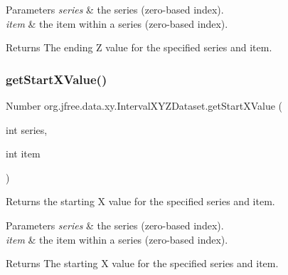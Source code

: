 \begin{DoxyParams}{Parameters}
{\em series} & the series (zero-\/based index). \\
\hline
{\em item} & the item within a series (zero-\/based index).\\
\hline
\end{DoxyParams}
\begin{DoxyReturn}{Returns}
The ending Z value for the specified series and item. 
\end{DoxyReturn}
\mbox{\label{interfaceorg_1_1jfree_1_1data_1_1xy_1_1_interval_x_y_z_dataset_aa5815ef78ab95b0d134c0b7a063bf955}} 
\subsubsection{\texorpdfstring{get\+Start\+X\+Value()}{getStartXValue()}}
{\footnotesize\ttfamily Number org.\+jfree.\+data.\+xy.\+Interval\+X\+Y\+Z\+Dataset.\+get\+Start\+X\+Value (\begin{DoxyParamCaption}\item[{int}]{series,  }\item[{int}]{item }\end{DoxyParamCaption})}

Returns the starting X value for the specified series and item.


\begin{DoxyParams}{Parameters}
{\em series} & the series (zero-\/based index). \\
\hline
{\em item} & the item within a series (zero-\/based index).\\
\hline
\end{DoxyParams}
\begin{DoxyReturn}{Returns}
The starting X value for the specified series and item. 
\end{DoxyReturn}
\mbox{\label{interfaceorg_1_1jfree_1_1data_1_1xy_1_1_interval_x_y_z_dataset_ae30382e9a7465720784e27e3102518a7}} 
